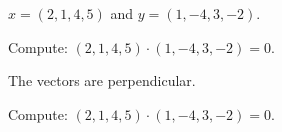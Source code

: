 \documentclass{ximera}
\begin{document}
\begin{exercise} \label{c1.4.1c}
  $x=(2,1,4,5)$ and $y=(1,-4,3,-2)$.
    \begin{multipleChoice}
  \end{multipleChoice}
  \begin{hint}
    Compute: $(2,1,4,5) \cdot (1,-4,3,-2) = 0$.
  \end{hint}

\begin{solution}
\ans The vectors are perpendicular.

\soln Compute: $(2,1,4,5) \cdot (1,-4,3,-2) = 0$.

\end{solution}
\end{exercise}
\end{document}
